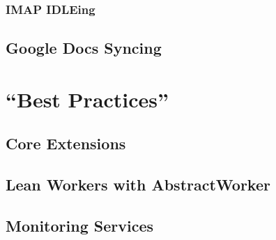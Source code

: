 \lipsum[1]

\subsubsection{IMAP IDLEing}

\lipsum[1]

\subsection{Google Docs Syncing}

\lipsum[1]


\section{``Best Practices''}

\lipsum[1]

\subsection{Core Extensions}

\lipsum[1]

\subsection{Lean Workers with AbstractWorker}

\lipsum[1]

\subsection{Monitoring Services}

\lipsum[1]

